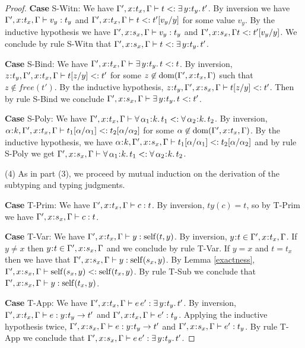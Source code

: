 \documentclass[11pt]{article}
\newcommand{\al}{\alpha}
\newcommand{\bind}{\hspace{0.05em}{:}\hspace{0.05em}} %
\newcommand{\existype}[3]{\exists\, #1\bind #2.\, #3}
\newcommand{\polytype}[3]{\forall\, #1\bind #2.\, #3}
\newcommand{\functype}[3]{#1\bind #2 \rightarrow #3}
\newcommand{\dom}[1]{{\rm dom}(#1)}
\begin{document}
\begin{proof}
{\bf Case} {\sc S-Witn}: We have $\Gamma', x\bind t_x, \Gamma \vdash t <: \existype{y}{t_y}{t'}$. By inversion we have $\Gamma', x\bind t_x, \Gamma \vdash v_y : t_y$ and $\Gamma', x\bind t_x, \Gamma \vdash t <: t'[v_y/y]$ for some value $v_y$. By the inductive hypothesis we have $\Gamma', x\bind s_x, \Gamma \vdash v_y : t_y$ and $\Gamma', x\bind s_x, \Gamma t <: t'[v_y/y]$. We conclude by rule {\sc S-Witn} that $\Gamma', x\bind s_x, \Gamma \vdash t <: \existype{y}{t_y}{t'}$.

{\bf Case} {\sc S-Bind}: We have $\Gamma', x\bind t_x, \Gamma \vdash \existype{y}{t_y}{t}<: t$. By inversion, $z\bind t_y,\Gamma', x\bind t_x, \Gamma \vdash t[z/y] <: t'$ for some $z\not\in\dom{\Gamma', x\bind t_x, \Gamma}$ such that $z \not\in free(t')$. By the inductive hypothesis, $z\bind t_y, \Gamma', x\bind s_x, \Gamma \vdash t[z/y] <: t'$. Then by rule {\sc S-Bind} we conclude $\Gamma', x\bind s_x, \Gamma \vdash \existype{y}{t_y}{t} <: t'$.

{\bf Case} {\sc S-Poly}: We have $\Gamma', x\bind t_x, \Gamma \vdash \polytype{\al_1}{k}{t_1}<: \polytype{\al_2}{k}{t_2}$. By inversion, $\al\bind k, \Gamma', x\bind t_x, \Gamma \vdash t_1[\al/\al_1] <: t_2[\al/\al_2]$ for some $\al\not\in\dom{\Gamma', x\bind t_x, \Gamma}$. By the inductive hypothesis, we have $\al\bind k, \Gamma', x\bind s_x, \Gamma \vdash t_1[\al/\al_1] <: t_2[\al/\al_2]$ and by rule {\sc S-Poly} we get $\Gamma', x\bind s_x, \Gamma \vdash \polytype{\al_1}{k}{t_1} <: \polytype{\al_2}{k}{t_2}$.

(4) As in part (3), we proceed by mutual induction on the derivation of the subtyping and typing judgments.

{\bf Case} {\sc T-Prim}: We have $\Gamma', x\bind t_x, \Gamma \vdash c : t$. By inversion, $ty(c) = t$, so by {\sc T-Prim} we have $\Gamma', x\bind s_x, \Gamma \vdash c : t$.

{\bf Case} {\sc T-Var}: We have $\Gamma', x\bind t_x, \Gamma \vdash y : {\rm self}(t,y)$. By inversion, $y\bind t \in \Gamma', x\bind t_x, \Gamma$. If $y\neq x$ then $y\bind t \in \Gamma', x\bind s_x, \Gamma$ and we conclude by rule {\sc T-Var}. If $y = x$ and $t = t_x$ then we have that $\Gamma', x\bind s_x, \Gamma \vdash y : {\rm self}(s_x, y)$. 
By Lemma \ref{exactness}, $\Gamma', x\bind s_x, \Gamma \vdash {\rm self}(s_x, y) <: {\rm self}(t_x, y)$. By rule {\sc T-Sub} we conclude that $\Gamma', x\bind s_x, \Gamma \vdash y : {\rm self}(t_x, y)$.

{\bf Case} {\sc T-App}: We have $\Gamma', x\bind t_x, \Gamma \vdash e\, e' : \existype{y}{t_y}{t'}$. By inversion, $\Gamma', x\bind t_x, \Gamma \vdash e : \functype{y}{t_y}{t'}$ and $\Gamma', x\bind t_x, \Gamma \vdash e' : t_y$. Applying the inductive hypothesis twice, $\Gamma', x\bind s_x, \Gamma \vdash e : \functype{y}{t_y}{t'}$ and $\Gamma', x\bind s_x, \Gamma \vdash e' : t_y$. By rule {\sc T-App} we conclude that $\Gamma', x\bind s_x, \Gamma \vdash e\, e' : \existype{y}{t_y}{t'}$.


\end{proof}
\end{document}
